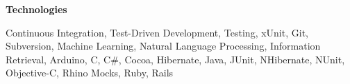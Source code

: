 \documentclass[11pt]{article}
\begin{document}
  {\large \textbf{Technologies}}

  \begin{flushleft}
    \addtolength{\leftskip}{.3in} 
    Continuous Integration, Test-Driven Development, Testing, xUnit, Git, Subversion, Machine Learning, Natural Language Processing, Information Retrieval, Arduino, C, C\#, Cocoa, Hibernate, Java, JUnit, NHibernate, NUnit, Objective-C, Rhino Mocks, Ruby, Rails
  \end{flushleft}
\end{document}
